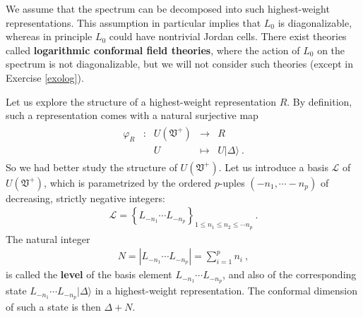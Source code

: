 \documentclass[12pt,a4paper,notitlepage]{report}
\numberwithin{equation}{section}
\theoremstyle{break}
\begin{document}
We assume that the spectrum can be decomposed into such highest-weight representations.
This assumption in particular implies that $L_0$ is diagonalizable, whereas in principle $L_0$ could have nontrivial Jordan cells.
There exist theories called \textbf{\boldmath logarithmic conformal field theories}, where the action of $L_0$ on the spectrum is not diagonalizable, but we will not consider such theories (except in Exercise \ref{exolog}).

Let us explore the structure of a highest-weight representation $R$.
By definition, such a representation comes with a natural surjective map
\begin{align}
\begin{array}{cclcl}
 \varphi_R & : & U(\mathfrak{V}^+) & \rightarrow & R 
\\
 &  & U & \mapsto & U|\Delta\rangle \ .
\end{array}
\label{pur}
\end{align}
So we had better study the structure of $U(\mathfrak{V}^+)$.
Let us introduce a basis $\mathcal{L}$ of $U(\mathfrak{V}^+)$, which is parametrized by the ordered $p$-uples $(-n_1,\cdots -n_p)$ of decreasing, strictly negative integers:
\begin{align}
\mathcal{L} =   \left\{ L_{-n_1} \cdots L_{-n_p}  \right\}_{1\leq n_1\leq n_2\leq \cdots n_p} \ .
\label{lels}
\end{align}
The natural integer
\begin{align}
 N=\left|L_{-n_1} \cdots L_{-n_p}\right|=\sum_{i=1}^p n_i \ ,
\label{nsn}
\end{align}
is called the \textbf{level} of the basis element $L_{-n_1} \cdots L_{-n_p}$, and also of the corresponding state $L_{-n_1} \cdots L_{-n_p}|\Delta\rangle$ in a highest-weight representation.
The conformal dimension of such a state is then $\Delta+N$. 
\end{document}
